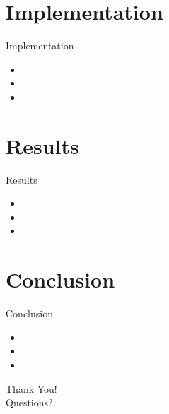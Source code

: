 \documentclass{beamer}
\begin{document}
\section{Implementation}
\begin{frame}{Implementation}
    \begin{itemize}
        \item 
        \item 
        \item 
    \end{itemize}
\end{frame}

\section{Results}
\begin{frame}{Results}
    \begin{itemize}
        \item 
        \item 
        \item 
    \end{itemize}
\end{frame}

\section{Conclusion}
\begin{frame}{Conclusion}
    \begin{itemize}
        \item 
        \item 
        \item 
    \end{itemize}
\end{frame}

\begin{frame}
    \begin{center}
        \Huge Thank You! \\
        \vspace{1cm}
        \Large Questions?
    \end{center}
\end{frame}
\end{document}
